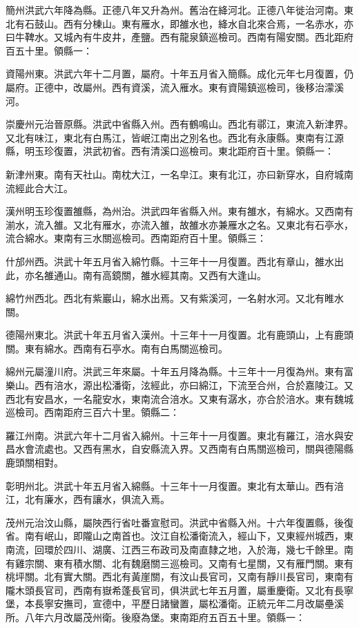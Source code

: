 簡州洪武六年降為縣。正德八年又升為州。舊治在絳河北。正德八年徙治河南。東北有石鼓山。西有分棟山。東有雁水，即雒水也，絳水自北來合焉，一名赤水，亦曰牛鞞水。又城內有牛皮井，產鹽。西有龍泉鎮巡檢司。西南有陽安關。西北距府百五十里。領縣一：

資陽州東。洪武六年十二月置，屬府。十年五月省入簡縣。成化元年七月復置，仍屬府。正德中，改屬州。西有資溪，流入雁水。東有資陽鎮巡檢司，後移治濛溪河。

崇慶州元治晉原縣。洪武中省縣入州。西有鶴鳴山。西北有鄩江，東流入新津界。又北有味江，東北有白馬江，皆岷江南出之別名也。西北有永康縣。東南有江源縣，明玉珍復置，洪武初省。西有清溪口巡檢司。東北距府百十里。領縣一：

新津州東。南有天社山。南枕大江，一名皁江。東有北江，亦曰新穿水，自府城南流經此合大江。

漢州明玉珍復置雒縣，為州治。洪武四年省縣入州。東有雒水，有綿水。又西南有湔水，流入雒。又北有雁水，亦流入雒，故雒水亦兼雁水之名。又東北有石亭水，流合綿水。東南有三水關巡檢司。西南距府百十里。領縣三：

什邡州西。洪武十年五月省入綿竹縣。十三年十一月復置。西北有章山，雒水出此，亦名雒通山。南有高鏡關，雒水經其南。又西有大逢山。

綿竹州西北。西北有紫巖山，綿水出焉。又有紫溪河，一名射水河。又北有睢水關。

德陽州東北。洪武十年五月省入漢州。十三年十一月復置。北有鹿頭山，上有鹿頭關。東有綿水。西南有石亭水。南有白馬關巡檢司。

綿州元屬潼川府。洪武三年來屬。十年五月降為縣。十三年十一月復為州。東有富樂山。西有涪水，源出松潘衛，泫經此，亦曰綿江，下流至合州，合於嘉陵江。又西北有安昌水，一名龍安水，東南流合涪水。又東有潺水，亦合於涪水。東有魏城巡檢司。西南距府三百六十里。領縣二：

羅江州南。洪武六年十二月省入綿州。十三年十一月復置。東北有羅江，涪水與安昌水會流處也。又西有黑水，自安縣流入界。又西南有白馬關巡檢司，關與德陽縣鹿頭關相對。

彰明州北。洪武十年五月省入綿縣。十三年十一月復置。東北有太華山。西有涪江，北有廉水，西有讓水，俱流入焉。

茂州元治汶山縣，屬陜西行省吐番宣慰司。洪武中省縣入州。十六年復置縣，後復省。南有岷山，即隴山之南首也。汶江自松潘衛流入，經山下，又東經州城西，東南流，回環於四川、湖廣、江西三布政司及南直隸之地，入於海，幾七千餘里。南有雞宗關、東有積水關、北有魏磨關三巡檢司。又南有七星關，又有雁門關。東有桃坪關。北有實大關。西北有黃崖關，有汶山長官司，又南有靜川長官司，東南有隴木頭長官司，西南有嶽希蓬長官司，俱洪武七年五月置，屬重慶衛。又北有長寧堡，本長寧安撫司，宣德中，平歷日諸蠻置，屬松潘衛。正統元年二月改屬壘溪所。八年六月改屬茂州衛。後廢為堡。東南距府五百五十里。領縣一：

